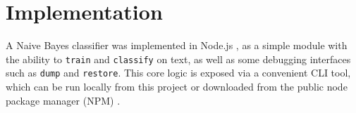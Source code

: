 \section{Implementation}
\label{section:implementation}
A Naive Bayes classifier was implemented in Node.js \cite{node}, as a simple module with the ability to \texttt{train}
and \texttt{classify} on text, as well as some debugging interfaces such as \texttt{dump} and \texttt{restore}. This
core logic is exposed via a convenient CLI tool, which can be run locally from this project or downloaded from the
public node package manager (NPM) \cite{rdn-naive-bayes}.
